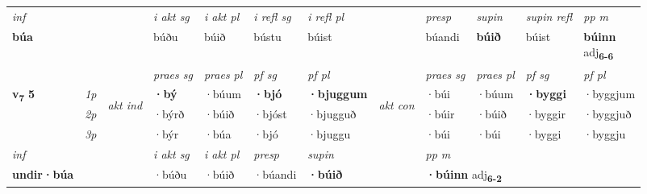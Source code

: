 \begin{longtable}[l]{X>{\footnotesize\itshape}llXXXXlXXXX}
   {\textit{inf}} & &  & \textit{i akt sg} & \textit{i akt pl} & \textit{i refl sg} & \textit{i refl pl} && \textit{presp} & \textit{supin} & \textit{supin refl} & \textit{pp m} \\*
  {\textbf{búa}} & && búðu  & búið & bústu & búist && búandi &  \textbf{búið} & búist & \specialcell{\textbf{búinn} \\ adj\textbf{\textsubscript{6-6}}} \\*

\midrule

 & &   & \textit{praes sg}  & \textit{praes pl}    & \textit{ pf sg} & \textit{pf pl} & & \textit{praes sg}  & \textit{praes pl}    & \textit{pf sg} & \textit{pf pl }  \\ \cmidrule{4-7} \cmidrule{9-12}
 \multirow{2}{*}{{{\textbf{v{\textsubscript{7}}} \Large{\textbf{5}}}}}  & 1p & \multirow{3}{*}{\begin{turn}{90}\textit{akt ind}\end{turn}} & \textbf{·bý} & ·búum & \textbf{·bjó} & \textbf{·bjuggum} & \multirow{3}{*}{\begin{turn}{90}\textit{akt con}\end{turn}} &·búi & ·búum & \textbf{·byggi} & ·byggjum\\*
 & 2p &  &  ·býrð  & ·búið & ·bjóst & ·bjugguð & & ·búir & ·búið & ·byggir & ·byggjuð \\*
 & 3p &  & ·býr & ·búa & ·bjó & ·bjuggu & & ·búi & ·búi& ·byggi & ·byggju \\*
\cmidrule{4-7} \cmidrule{9-12}

   {\textit{inf}} & &  & \textit{i akt sg} & \textit{i akt pl}   & \textit{presp} & \textit{supin}  && \textit{pp m} \\*
  {\textbf{undir\allowbreak ·búa}} & && ·búðu  & ·búið   & ·búandi &  \textbf{·búið}  && \multicolumn{2}{l}{\textbf{·búinn} adj\textbf{\textsubscript{6-2}}} \\*

\midrule


\end{longtable}

